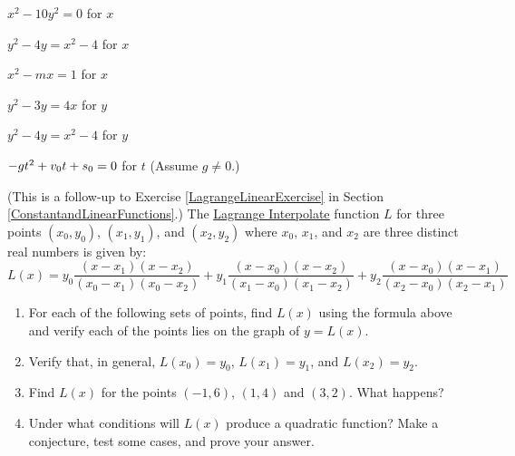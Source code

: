 \begin{shortexenum}
\item $x^{2} - 10y^{2} = 0$ for $x$ \label{solvequadvarifirst}
\item $y^{2} - 4y = x^{2} - 4$ for $x$
\item $x^{2} - mx = 1$ for $x$
\item $y^{2} - 3y = 4x$ for $y$
\item $y^{2} - 4y = x^{2} - 4$ for $y$
\item $-gt^{2} + v_{\mbox{\scriptsize $0$}}t + s_{\mbox{\scriptsize $0$}} = 0$ for $t$ (Assume $g \neq 0$.) \label{solvequadvarilast}
\end{shortexenum}

\begin{exenum}

\item \label{LagrangeQuadExercise} (This is a follow-up to Exercise \ref{LagrangeLinearExercise} in Section \ref{ConstantandLinearFunctions}.) The \href{https://en.wikipedia.org/wiki/Lagrange_polynomial}{\underline{Lagrange Interpolate}} function $L$ for three points $(x_{0}, y_{0})$, $(x_{1}, y_{1})$, and  $(x_{2}, y_{2})$ where $x_{0}$,  $x_{1}$, and $x_{2}$ are three distinct real numbers  is given by: \[L(x) = y_{0}  \dfrac{(x - x_{1}) (x - x_{2}) }{(x_{0} - x_{1})(x_{0} - x_{2})}+ y_{1}  \dfrac{(x - x_{0}) (x - x_{2}) }{(x_{1} - x_{0})(x_{1} - x_{2})} +  y_{2}  \dfrac{(x - x_{0}) (x - x_{1}) }{(x_{2} - x_{0})(x_{2} - x_{1})}\]

\begin{enumerate}

\item For each of the following sets of points,  find  $L(x)$ using the formula above and verify each of the points lies on the graph of $y = L(x)$.


\item  Verify that, in general, $L(x_{0}) = y_{0}$,  $L(x_{1}) = y_{1}$, and $L(x_{2}) = y_{2}$.

\item Find $L(x)$ for the points $(-1, 6)$, $(1, 4)$ and $(3,2)$.  What happens?  %

\item  Under what conditions will $L(x)$ produce a quadratic function?  Make a conjecture, test some cases, and prove your answer.

\end{enumerate}

\end{exenum}

